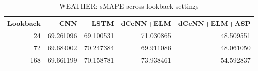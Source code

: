 \begin{table}
\caption{WEATHER: sMAPE across lookback settings}
\begin{tabular}{rrrrr}
\toprule
Lookback & CNN & LSTM & dCeNN+ELM & dCeNN+ELM+ASP \\
\midrule
24 & 69.261096 & 69.100531 & 71.030865 & 48.509551 \\
72 & 69.689002 & 70.247384 & 69.911086 & 48.061050 \\
168 & 69.661199 & 70.158781 & 73.938461 & 54.592837 \\
\bottomrule
\end{tabular}
\end{table}
